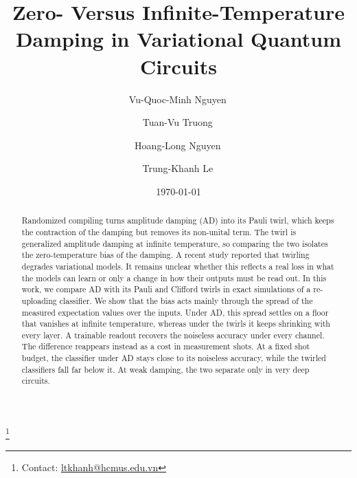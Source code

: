 \documentclass[
 aps,pra,
 twocolumn,
 superscriptaddress,
 longbibliography,
 nofootinbib
]{revtex4-2}
\makeatletter
\newcommand{\authornote}{Contact:
\href{mailto:ltkhanh@hcmus.edu.vn}{ltkhanh@hcmus.edu.vn}}
\makeatother
\begin{document}
\title{Zero- Versus Infinite-Temperature Damping in Variational Quantum Circuits}

\author{Vu-Quoc-Minh Nguyen\,}

\author{Tuan-Vu Truong\,}

\author{Hoang-Long Nguyen\,}

\author{Trung-Khanh Le\,}
\thanks{\authornote}

\date{\today}

\begin{abstract}
Randomized compiling turns amplitude damping (AD) into its Pauli twirl, which
keeps the contraction of the damping but removes its non-unital term. The twirl
is generalized amplitude damping at infinite temperature, so comparing the two
isolates the zero-temperature bias of the damping. A recent study reported that
twirling degrades variational models. It remains unclear whether this reflects
a real loss in what the models can learn or only a change in how their outputs
must be read out. In this work, we compare AD with its Pauli and Clifford
twirls in exact simulations of a re-uploading classifier. We show that the bias
acts mainly through the spread of the measured expectation values over the
inputs. Under AD, this spread settles on a floor that vanishes at infinite
temperature, whereas under the twirls it keeps shrinking with every layer. A
trainable readout recovers the noiseless accuracy under every channel. The
difference reappears instead as a cost in measurement shots. At a fixed shot
budget, the classifier under AD stays close to its noiseless accuracy, while
the twirled classifiers fall far below it. At weak damping, the two separate
only in very deep circuits.
\end{abstract}

\maketitle
\end{document}
